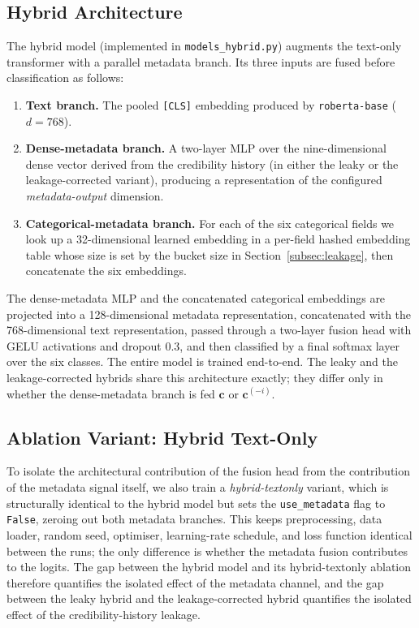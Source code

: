 \documentclass[journal]{IEEEtran}
\begin{document}
\subsection{Hybrid Architecture}
The hybrid model (implemented in \texttt{models\_hybrid.py}) augments the text-only transformer with a parallel metadata branch. Its three inputs are fused before classification as follows:

\begin{enumerate}
  \item \textbf{Text branch.} The pooled \texttt{[CLS]} embedding produced by \texttt{roberta-base} ($d = 768$).
  \item \textbf{Dense-metadata branch.} A two-layer MLP over the nine-dimensional dense vector derived from the credibility history (in either the leaky or the leakage-corrected variant), producing a representation of the configured \emph{metadata-output} dimension.
  \item \textbf{Categorical-metadata branch.} For each of the six categorical fields we look up a 32-dimensional learned embedding in a per-field hashed embedding table whose size is set by the bucket size in Section~\ref{subsec:leakage}, then concatenate the six embeddings.
\end{enumerate}

The dense-metadata MLP and the concatenated categorical embeddings are projected into a 128-dimensional metadata representation, concatenated with the 768-dimensional text representation, passed through a two-layer fusion head with GELU activations and dropout 0.3, and then classified by a final softmax layer over the six classes. The entire model is trained end-to-end. The leaky and the leakage-corrected hybrids share this architecture exactly; they differ only in whether the dense-metadata branch is fed $\mathbf{c}$ or $\mathbf{c}^{(-i)}$.

\subsection{Ablation Variant: Hybrid Text-Only}
To isolate the architectural contribution of the fusion head from the contribution of the metadata signal itself, we also train a \emph{hybrid-textonly} variant, which is structurally identical to the hybrid model but sets the \texttt{use\_metadata} flag to \texttt{False}, zeroing out both metadata branches. This keeps preprocessing, data loader, random seed, optimiser, learning-rate schedule, and loss function identical between the runs; the only difference is whether the metadata fusion contributes to the logits. The gap between the hybrid model and its hybrid-textonly ablation therefore quantifies the isolated effect of the metadata channel, and the gap between the leaky hybrid and the leakage-corrected hybrid quantifies the isolated effect of the credibility-history leakage.
\end{document}
